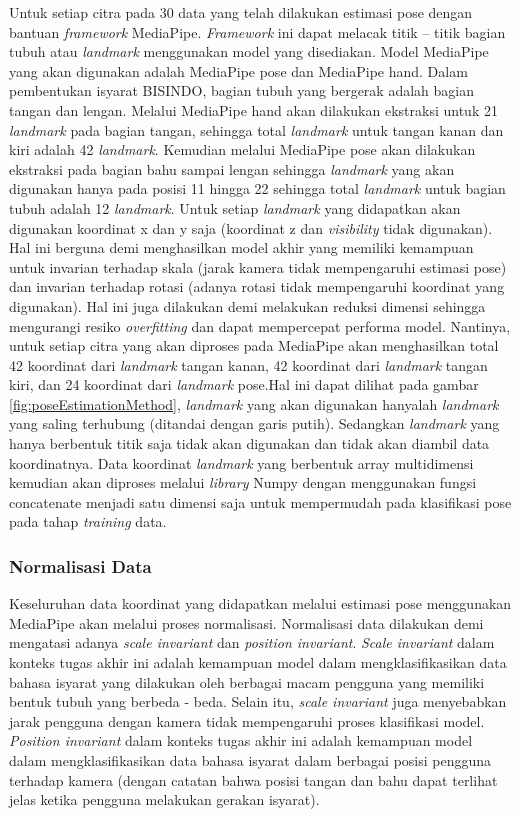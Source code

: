Untuk setiap citra pada 30 data yang telah dilakukan estimasi pose dengan bantuan \textit{framework} MediaPipe. \textit{Framework} ini dapat melacak titik – titik bagian tubuh atau \textit{landmark} menggunakan model yang disediakan. Model MediaPipe yang akan digunakan adalah MediaPipe pose dan MediaPipe hand. Dalam pembentukan isyarat BISINDO, bagian tubuh yang bergerak adalah bagian tangan dan lengan. Melalui MediaPipe hand akan dilakukan ekstraksi untuk 21 \textit{landmark} pada bagian tangan, sehingga total \textit{landmark} untuk tangan kanan dan kiri adalah 42 \textit{landmark}. Kemudian melalui MediaPipe pose akan dilakukan ekstraksi pada bagian bahu sampai lengan sehingga \textit{landmark} yang akan digunakan hanya pada posisi 11 hingga 22 sehingga total \textit{landmark} untuk bagian tubuh adalah 12 \textit{landmark}. Untuk setiap \textit{landmark} yang didapatkan akan digunakan koordinat x dan y saja (koordinat z dan \textit{visibility} tidak digunakan). Hal ini berguna demi menghasilkan model akhir yang memiliki kemampuan untuk invarian terhadap skala (jarak kamera tidak mempengaruhi estimasi pose) dan invarian terhadap rotasi (adanya rotasi tidak mempengaruhi koordinat yang digunakan). Hal ini juga dilakukan demi melakukan reduksi dimensi sehingga mengurangi resiko \textit{overfitting} dan dapat mempercepat performa model. Nantinya, untuk setiap citra yang akan diproses pada MediaPipe akan menghasilkan total 42 koordinat dari \textit{landmark} tangan kanan, 42 koordinat dari \textit{landmark} tangan kiri, dan 24 koordinat dari \textit{landmark} pose.Hal ini dapat dilihat pada gambar \ref{fig:poseEstimationMethod}, \textit{landmark} yang akan digunakan hanyalah \textit{landmark} yang saling terhubung (ditandai dengan garis putih). Sedangkan \textit{landmark} yang hanya berbentuk titik saja tidak akan digunakan dan tidak akan diambil data koordinatnya. Data koordinat \textit{landmark} yang berbentuk array multidimensi kemudian akan diproses melalui \textit{library} Numpy dengan menggunakan fungsi concatenate menjadi satu dimensi saja untuk mempermudah pada klasifikasi pose pada tahap \textit{training} data.

\subsubsection{Normalisasi Data}
Keseluruhan data koordinat yang didapatkan melalui estimasi pose menggunakan MediaPipe akan melalui proses normalisasi. Normalisasi data dilakukan demi mengatasi adanya \textit{scale invariant} dan \textit{position invariant}. \textit{Scale invariant} dalam konteks tugas akhir ini adalah kemampuan model dalam mengklasifikasikan data bahasa isyarat yang dilakukan oleh berbagai macam pengguna yang memiliki bentuk tubuh yang berbeda - beda. Selain itu, \textit{scale invariant} juga menyebabkan jarak pengguna dengan kamera tidak mempengaruhi proses klasifikasi model. \textit{Position invariant} dalam konteks tugas akhir ini adalah kemampuan model dalam mengklasifikasikan data bahasa isyarat dalam berbagai posisi pengguna terhadap kamera (dengan catatan bahwa posisi tangan dan bahu dapat terlihat jelas ketika pengguna melakukan gerakan isyarat).

